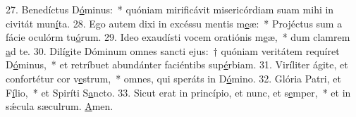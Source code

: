 27. Benedíctus D\uline{ó}minus:~* quóniam mirificávit misericórdiam suam mihi in civitát mun\uline{í}ta.
28. Ego autem dixi in excéssu mentis m\uline{e}æ:~* Projéctus sum a fácie oculórm tu\uline{ó}rum.
29. Ideo exaudísti vocem oratiónis m\uline{e}æ,~* dum clamrem \uline{a}d te.
30. Dilígite Dóminum omnes sancti ejus:~† quóniam veritátem requíret D\uline{ó}minus,~* et retríbuet abundánter faciéntibs sup\uline{é}rbiam.
31. Viríliter ágite, et confortétur cor v\uline{e}strum,~* omnes, qui speráts in D\uline{ó}mino.
32. Glória Patri, et F\uline{í}lio,~* et Spiríti S\uline{a}ncto.
33. Sicut erat in princípio, et nunc, et s\uline{e}mper,~* et in sǽcula sæculrum. \uline{A}men.
